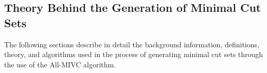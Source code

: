 \subsection{Theory Behind the Generation of Minimal Cut Sets}
\label{sec:generate_theory}
The following sections describe in detail the background information, definitions, theory, and algorithms used in the process of generating minimal cut sets through the use of the All-MIVC algorithm.
